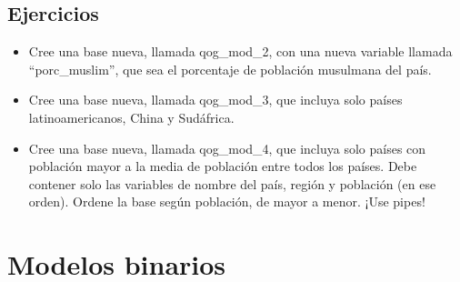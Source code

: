 \documentclass[]{book}
\providecommand{\tightlist}{%
  \setlength{\itemsep}{0pt}\setlength{\parskip}{0pt}}
\begin{document}
\section{Ejercicios}\label{ejercicios-1}

\begin{itemize}
\tightlist
\item
  Cree una base nueva, llamada qog\_mod\_2, con una nueva variable
  llamada ``porc\_muslim'', que sea el porcentaje de población musulmana
  del país.
\item
  Cree una base nueva, llamada qog\_mod\_3, que incluya solo países
  latinoamericanos, China y Sudáfrica.
\item
  Cree una base nueva, llamada qog\_mod\_4, que incluya solo países con
  población mayor a la media de población entre todos los países. Debe
  contener solo las variables de nombre del país, región y población (en
  ese orden). Ordene la base según población, de mayor a menor. ¡Use
  pipes!
\end{itemize}

\chapter{Modelos binarios}\label{modelos-binarios}
\end{document}
